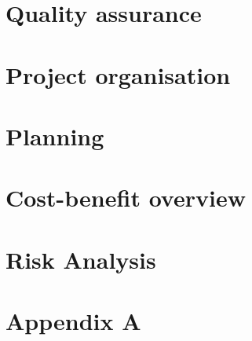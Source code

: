 \documentclass[11pt, a4paper]{report}
\begin{document}
\begin{justify}
\chapter{Quality assurance}
	

\chapter{Project organisation}
	

\chapter{Planning}
	

\chapter{Cost-benefit overview}
	


\chapter{Risk Analysis}
	

\printbibliography[
heading=bibintoc,
title={Bibliography}
]



\appendix

\chapter{Appendix A}


	\end{justify}
\end{document}
